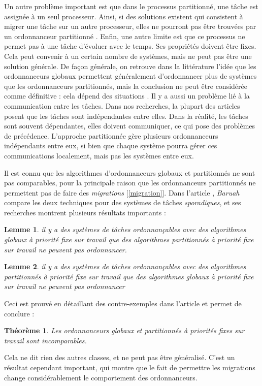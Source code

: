 \documentclass[11pt,a4paper,oneside]{report}
\newtheorem{mytheorem}{Théorème}
\newtheorem{mylemme}{Lemme}
\begin{document}
	Un autre problème important est que dans le processus partitionné, une tâche est 
	assignée à un seul processeur. 
	Ainsi, si des solutions existent qui consistent à migrer une tâche sur un autre processeur, 
	elles ne pourront pas être trouvées 
	par un ordonnanceur partitionné \cite{ramamurthy_static-priority_2000}. 
	Enfin, une autre limite est que ce processus ne permet pas à une tâche d'évoluer avec le temps. 
	Ses propriétés doivent être fixes. 
	Cela peut convenir à un certain nombre de systèmes, mais ne peut pas être une solution générale.
	De façon générale, on retrouve dans la littérature l'idée que les ordonnanceurs globaux 
	permettent généralement d'ordonnancer plus de systèmes que les ordonnanceurs partitionnés, 
	mais la conclusion ne peut être considérée comme définitive : cela dépend des situations
	\cite{lopez_utilization_2004}.
	Il y a aussi un problème lié à la communication entre les tâches. Dans nos recherches, 
	la plupart des articles posent que les tâches sont indépendantes entre elles. Dans 
	la réalité, les tâches sont souvent dépendantes, elles doivent communiquer, ce qui pose 
	des problèmes de précédence. 
	L'approche partitionnée gère plusieurs ordonnanceurs indépendants entre eux, si bien 
	que chaque système pourra gérer ces communications localement, mais pas les systèmes entre eux. 
	\medskip
	
	Il est connu que les algorithmes d'ordonnanceurs globaux et partitionnés ne sont pas comparables, 
	pour la principale raison que les ordonnanceurs partitionnés ne permettent pas de faire des 
	\textit{migrations} [\ref{migration}]. Dans l'article \cite{baruah_techniques_2007}, \textit{Baruah} 
	compare les deux techniques pour des systèmes de tâches \textit{sporadiques}, et 
	ses recherches montrent plusieurs résultats importants :\medskip
	\begin{mylemme}
		il y a des systèmes de tâches ordonnançables avec des algorithmes globaux à priorité fixe 
		sur travail que des algorithmes partitionnés à priorité fixe sur travail ne peuvent pas ordonnancer.
	\end{mylemme}
	
	\begin{mylemme}
		il y a des systèmes de tâches ordonnançables avec des algorithmes partitionnés à priorité fixe 
		sur travail que des algorithmes globaux à priorité fixe sur travail ne peuvent pas ordonnancer
	\end{mylemme}
	Ceci est prouvé en détaillant des contre-exemples dans l'article et permet de conclure :\medskip
	\begin{mytheorem}
		Les ordonnanceurs globaux et partitionnés à priorités fixes sur travail sont incomparables.
	\end{mytheorem}
	Cela ne dit rien des autres classes, et ne peut pas être généralisé. C'est 
	un résultat cependant important, qui montre que le fait de permettre les migrations
	change considérablement le comportement des ordonnanceurs.
	
\end{document}
